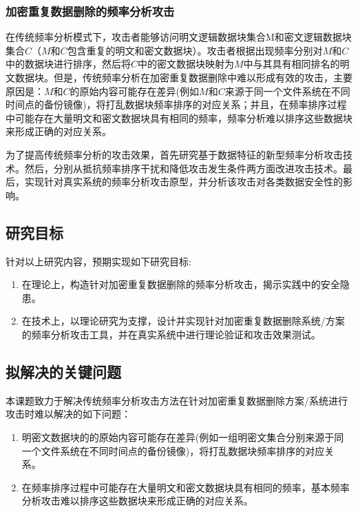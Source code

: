 \subsubsection*{加密重复数据删除的频率分析攻击}

在传统频率分析模式下，攻击者能够访问明文逻辑数据块集合M和密文逻辑数据块集合$C$（$M$和$C$包含重复的明文和密文数据块）。攻击者根据出现频率分别对$M$和$C$中的数据块进行排序，然后将$C$中的密文数据块映射为$M$中与其具有相同排名的明文数据块。但是，传统频率分析在加密重复数据删除中难以形成有效的攻击，主要原因是：$M$和$C$的原始内容可能存在差异(例如$M$和$C$来源于同一个文件系统在不同时间点的备份镜像)，将打乱数据块频率排序的对应关系；并且，在频率排序过程中可能存在大量明文和密文数据块具有相同的频率，频率分析难以排序这些数据块来形成正确的对应关系。

为了提高传统频率分析的攻击效果，首先研究基于数据特征的新型频率分析攻击技术。然后，分别从抵抗频率排序干扰和降低攻击发生条件两方面改进攻击技术。最后，实现针对真实系统的频率分析攻击原型，并分析该攻击对各类数据安全性的影响。


\subsection{研究目标}

针对以上研究内容，预期实现如下研究目标: 
\begin{enumerate}
    \item 在理论上，构造针对加密重复数据删除的频率分析攻击，揭示实践中的安全隐患。
    \item 在技术上，以理论研究为支撑，设计并实现针对加密重复数据删除系统/方案的频率分析攻击工具，并在真实系统中进行理论验证和攻击效果测试。 
\end{enumerate}


\subsection{拟解决的关键问题}

本课题致力于解决传统频率分析攻击方法在针对加密重复数据删除方案/系统进行攻击时难以解决的如下问题：

\begin{enumerate}
    \item 明密文数据块的的原始内容可能存在差异(例如一组明密文集合分别来源于同一个文件系统在不同时间点的备份镜像)，将打乱数据块频率排序的对应关系。
    \item 在频率排序过程中可能存在大量明文和密文数据块具有相同的频率，基本频率分析攻击难以排序这些数据块来形成正确的对应关系。
\end{enumerate}



